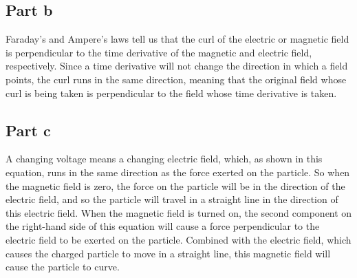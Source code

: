 \documentclass{article}
\begin{document}
\subsection{Part b}
Faraday's and Ampere's laws tell us that the curl of the electric or magnetic field is perpendicular to the time derivative of the magnetic and electric field, respectively. Since a time derivative will not change the direction in which a field points, the curl runs in the same direction, meaning that the original field whose curl is being taken is perpendicular to the field whose time derivative is taken.
\subsection{Part c}
A changing voltage means a changing electric field, which, as shown in this equation, runs in the same direction as the force exerted on the particle. So when the magnetic field is zero, the force on the particle will be in the direction of the electric field, and so the particle will travel in a straight line in the direction of this electric field. When the magnetic field is turned on, the second component on the right-hand side of this equation will cause a force perpendicular to the electric field  to be exerted on the particle. Combined with the electric field, which causes the charged particle to move in a straight line, this magnetic field will cause the particle to curve.
\end{document}
